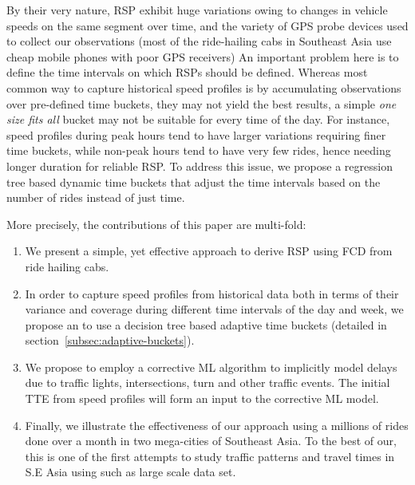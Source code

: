 By their very nature, \ac{RSP} exhibit huge variations owing to changes in vehicle speeds on the same segment over time, and the variety of GPS probe devices used to collect our observations (most of the ride-hailing cabs in Southeast Asia use cheap mobile phones with poor GPS receivers) An important problem here is to define the time intervals on which RSPs should be defined. Whereas most common way to capture historical speed profiles is by accumulating observations over pre-defined time buckets, they may not yield the best results, a simple \emph{one size fits all}  bucket may not be suitable for every time of the day. For instance, speed profiles during peak hours tend to have larger variations requiring finer time buckets, while non-peak hours tend to have very few rides, hence needing longer duration for reliable \ac{RSP}. To address this issue, we propose a regression tree based dynamic time buckets that adjust the time intervals based on the number of rides instead of just time.    

More precisely, the contributions of this paper are multi-fold: 
\begin{enumerate}
	\item We present a simple, yet effective approach to derive \ac{RSP} using \ac{FCD} from ride hailing cabs. 
	\item In order to capture speed profiles from historical data both in terms of their variance and coverage during different time intervals of the day and week, we propose an to use a decision tree based adaptive time buckets (detailed in section~\ref{subsec:adaptive-buckets}).
	\item We propose to employ a corrective \ac{ML} algorithm to implicitly model delays due to traffic lights, intersections, turn and other traffic events. The initial TTE from speed profiles will form an input to the corrective ML model. 
	\item Finally, we illustrate the effectiveness of our approach using a millions of rides done over a month in two mega-cities of Southeast Asia. To the best of our, this is one of the first attempts to study traffic patterns and travel times in S.E Asia using such as large scale data set.    
\end{enumerate}

